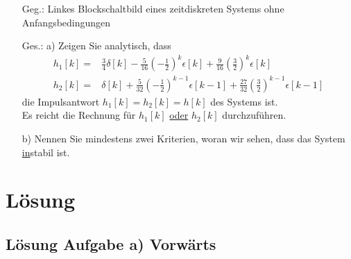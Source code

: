 \documentclass[11pt,a4paper,DIV=12]{scrartcl}
\begin{document}
%
\quad
\begin{minipage}{0.5\textwidth}
	\begin{itemize}
		\item[Geg.:] Linkes Blockschaltbild eines zeitdiskreten Systems ohne Anfangsbedingungen
		\item[Ges.: a)] Zeigen Sie analytisch, dass
		\begin{align*}
			h_1[k] =& \frac{3}{4} \delta[k] - \frac{5}{16}\left(-\frac{1}{2}\right)^k \epsilon[k] + \frac{9}{16}\left(\frac{3}{2}\right)^k \epsilon[k]\\
			h_2[k] =& \delta[k] + \frac{5}{32}\left(-\frac{1}{2}\right)^{k-1} \epsilon[k-1] + \frac{27}{32}\left(\frac{3}{2}\right)^{k-1} \epsilon[k-1]
		\end{align*}
		die Impulsantwort $h_1[k]=h_2[k]=h[k]$ des Systems ist.\\
		Es reicht die Rechnung für $h_1[k]$ \underline{oder} $h_2[k]$ durchzuführen.
		\item[      b)] Nennen Sie mindestens zwei Kriterien, woran wir sehen, dass das System \underline{in}stabil ist.
	\end{itemize}
\end{minipage}
\quad
\newpage
%
\section{Lösung}
%
%
%
\subsection{Lösung Aufgabe a) Vorwärts}
\end{document}
